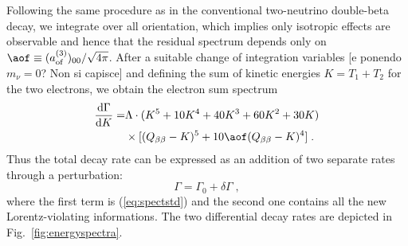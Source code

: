 Following the same procedure as in the conventional two-neutrino double-beta decay, we integrate over all orientation, which implies only isotropic effects are observable and hence that the residual spectrum depends only on $\aof\equiv(a_\text{of}^{(3)})_{00}/\sqrt{4\pi}$. After a suitable change of integration variables {\color{red}[e ponendo $m_\nu=0$? Non si capisce]} and defining the sum of kinetic energies $K=T_1+T_2$ for the two electrons, we obtain the electron sum spectrum
\[\begin{split}
	\frac{\text{d}\Gamma}{\text{d}K} =& \Lambda \cdot(K^5+10K^4+40K^3+60K^2+30K) \\
									  & \times[(Q_{\beta\beta}-K)^5+10\aof(Q_{\beta\beta}-K)^4]\;. \\
\end{split}\]
Thus the total decay rate can be expressed as an addition of two separate rates through a perturbation:
\[\Gamma=\Gamma_0+\delta\Gamma\;,\]
where the first term is (\ref{eq:spectstd}) and the second one contains all the new Lorentz-violating informations. The two differential decay rates are depicted in Fig.~\ref{fig:energyspectra}.
